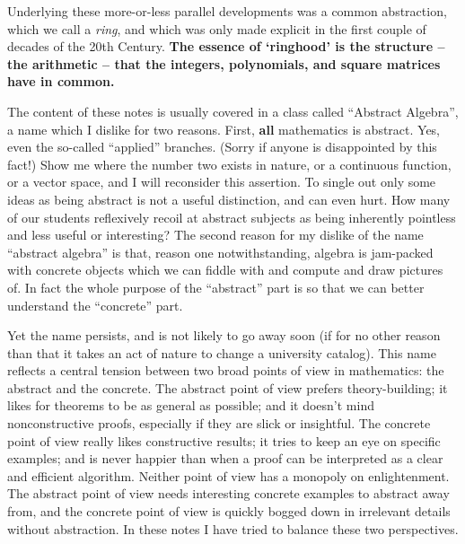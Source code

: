 Underlying these more-or-less parallel developments was a common abstraction, which we call a \emph{ring}, and which was only made explicit in the first couple of decades of the 20th Century.
\textbf{The essence of `ringhood' is the structure -- the arithmetic -- that the integers, polynomials, and square matrices have in common.}

The content of these notes is usually covered in a class called ``Abstract Algebra'', a name which I dislike for two reasons.
First, \textbf{all} mathematics is abstract.
Yes, even the so-called ``applied'' branches.
(Sorry if anyone is disappointed by this fact!)
Show me where the number two exists in nature, or a continuous function, or a vector space, and I will reconsider this assertion.
To single out only some ideas as being abstract is not a useful distinction, and can even hurt.
How many of our students reflexively recoil at abstract subjects as being inherently pointless and less useful or interesting?
The second reason for my dislike of the name ``abstract algebra'' is that, reason one notwithstanding, algebra is jam-packed with concrete objects which we can fiddle with and compute and draw pictures of.
In fact the whole purpose of the ``abstract'' part is so that we can better understand the ``concrete'' part.

Yet the name persists, and is not likely to go away soon (if for no other reason than that it takes an act of nature to change a university catalog).
This name reflects a central tension between two broad points of view in mathematics: the abstract and the concrete.
The abstract point of view prefers theory-building; it likes for theorems to be as general as possible; and it doesn't mind nonconstructive proofs, especially if they are slick or insightful.
The concrete point of view really likes constructive results; it tries to keep an eye on specific examples; and is never happier than when a proof can be interpreted as a clear and efficient algorithm.
Neither point of view has a monopoly on enlightenment.
The abstract point of view needs interesting concrete examples to abstract away from, and the concrete point of view is quickly bogged down in irrelevant details without abstraction.
In these notes I have tried to balance these two perspectives.
